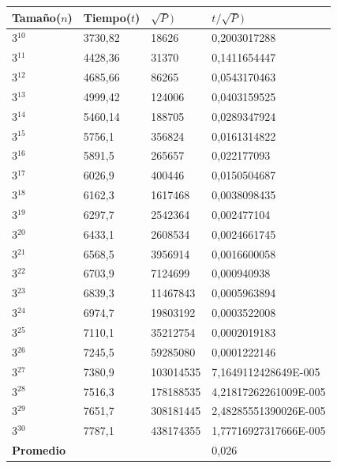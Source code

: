 \begin{table}[H]

    \begin{tabular}{ | l | l |l | l |}
    \hline
	Tamaño($n$) & Tiempo($t$) & \textbf{$\sqrt{P})$} & \textbf{$t/\sqrt{P})$}  \\ \hline
3$^{10}$ & 3730,82 & 18626 	& 0,2003017288 \\ \hline
3$^{11}	$ & 4428,36 & 31370 &	0,1411654447 \\ \hline
3$^{12}$ & 4685,66 & 86265  &	 0,0543170463 \\ \hline
3$^{13}	$ & 4999,42 & 124006 &	0,0403159525 \\ \hline
3$^{14}$	 & 5460,14	& 188705 & 0,0289347924 \\ \hline
3$^{15}$ & 	5756,1 & 	356824 & 0,0161314822 \\ \hline
3$^{16}$	 & 5891,5 & 265657  & 0,022177093 \\ \hline
3$^{17}	$ & 6026,9 &	400446 & 0,0150504687 \\ \hline
3$^{18}$	 & 6162,3 &	1617468 & 0,0038098435 \\ \hline
3$^{19}	$ & 6297,7 & 2542364 &	0,002477104 \\ \hline
3$^{20}$	 & 6433,1 & 2608534 &	 0,0024661745 \\ \hline
3$^{21}$ & 	6568,5 & 3956914 &	0,0016600058 \\ \hline
3$^{22}$	 & 6703,9 & 7124699 & 	0,000940938 \\ \hline
3$^{23}	$ & 6839,3 & 11467843	 & 0,0005963894 \\ \hline
3$^{24}$ & 	6974,7 & 19803192 & 	0,0003522008 \\ \hline
3$^{25}	$ & 7110,1 & 35212754 & 	0,0002019183 \\ \hline
3$^{26}$	 & 7245,5 & 59285080 & 0,0001222146 \\ \hline
3$^{27}$ &	7380,9 & 103014535 & 7,1649112428649E-005 \\ \hline
3$^{28}$	 & 7516,3 &	178188535 & 4,21817262261009E-005 \\ \hline
3$^{29}$ &	7651,7 & 308181445	& 2,48285551390026E-005 \\ \hline
3$^{30}$ &	7787,1 & 438174355 &	1,77716927317666E-005 \\ \hline

    \textbf{Promedio} & & & 0,026  \\ \hline

    \end{tabular}
\end{table}

